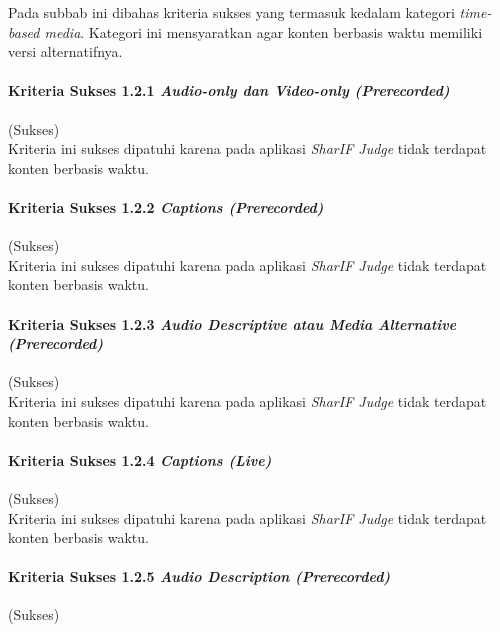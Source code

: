 Pada subbab ini dibahas kriteria sukses yang termasuk kedalam kategori \textit{time-based media}. Kategori ini mensyaratkan agar konten berbasis waktu memiliki versi alternatifnya.

\paragraph{Kriteria Sukses 1.2.1 \textit{Audio-only dan Video-only (Prerecorded)}}
\label{subsubsec:kepatuhan_kriteria_1.2.1}
(Sukses) \\

Kriteria ini sukses dipatuhi karena pada aplikasi \textit{SharIF Judge} tidak terdapat konten berbasis waktu.

\paragraph{Kriteria Sukses 1.2.2 \textit{Captions (Prerecorded)}}
\label{subsubsec:kepatuhan_kriteria_1.2.2}
(Sukses) \\

Kriteria ini sukses dipatuhi karena pada aplikasi \textit{SharIF Judge} tidak terdapat konten berbasis waktu.

\paragraph{Kriteria Sukses 1.2.3 \textit{Audio Descriptive atau Media Alternative (Prerecorded)}}
\label{subsubsec:kepatuhan_kriteria_1.2.3}
(Sukses) \\

Kriteria ini sukses dipatuhi karena pada aplikasi \textit{SharIF Judge} tidak terdapat konten berbasis waktu.

\paragraph{Kriteria Sukses 1.2.4 \textit{Captions (Live)}}
\label{subsubsec:kepatuhan_kriteria_1.2.4}
(Sukses) \\

Kriteria ini sukses dipatuhi karena pada aplikasi \textit{SharIF Judge} tidak terdapat konten berbasis waktu.

\paragraph{Kriteria Sukses 1.2.5 \textit{Audio Description (Prerecorded)}}
\label{subsubsec:kepatuhan_kriteria_1.2.5}
(Sukses) \\

